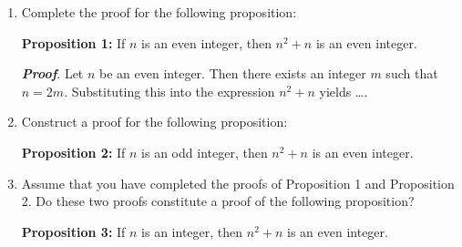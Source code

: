 \begin{previewactivity}\label{PA:propintegers} \hfill
\begin{enumerate}
\item Complete the proof for the following proposition:

\textbf{Proposition 1:}  If  $n$  is an even integer, then  $n^2  + n$ is an even integer.

\textbf{\emph{Proof}}.  Let  $n$  be an even integer.  Then there exists an integer  $m$  such that $n = 2m$.  Substituting this into the expression  $n^2  + n$ yields \ldots .

\item Construct a proof for the following proposition:

\textbf{Proposition 2:}  If  $n$  is an odd integer, then  $n^2  + n$ is an even integer.

\item Assume that you have completed the proofs of  Proposition 1 and Proposition 2.   Do these two proofs constitute a proof of the following proposition?

\textbf{Proposition 3:}  If  $n$  is an integer, then  $n^2  + n$ is an even integer.
\end{enumerate}
\end{previewactivity}
\hbreak





\endinput
%
